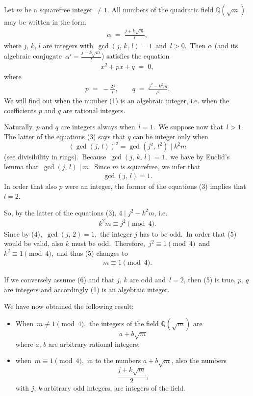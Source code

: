 \documentclass[12pt]{article}
\theoremstyle{definition}
\begin{document}
Let $m$ be a squarefree integer $\neq 1$.  All numbers of the 
quadratic field $\mathbb{Q}(\sqrt{m})$ may be written in the 
form
\begin{align}
\alpha \;=\; \frac{j+k\sqrt{m}}{l},
\end{align}
where $j,\,k,\,l$ are integers with\, $\gcd(j,\,k,\,l) = 1$\, 
and\, $l > 0$.\, Then $\alpha$ (and its algebraic conjugate\, 
$\alpha' = \frac{j-k\sqrt{m}}{l}$) satisfies the equation
\begin{align}
x^2+px+q \;=\; 0,
\end{align}
where
\begin{align}
p \;=\; -\frac{2j}{l}, \qquad q \;=\; \frac{j^2-k^2m}{l^2}.
\end{align}
We will find out when the number (1) is an algebraic integer, i.e. when the coefficients $p$ and $q$ are rational integers.

Naturally, $p$ and $q$ are integers always when\, $l = 1$.\, We 
suppose now that\, $l > 1$.\, The latter of the equations (3) 
says that $q$ can be integer only when
$$(\gcd(j,\,l))^2 = \gcd(j^2,\,l^2) \mid k^2m$$
(see divisibility in rings).\, Because\, $\gcd(j,\,k,\,l) = 1$,\, 
we have by Euclid's lemma that\, $\gcd(j,\,l) \mid m$.\, Since 
$m$ is squarefree, we infer that
\begin{align}
\gcd(j,\,l) = 1.
\end{align}
In order that also $p$ were an integer, the former of the 
equations (3) implies that\, $l = 2$.

So, by the latter of the equations (3),\; $4 \mid j^2\!-\!k^2m$, 
i.e.
\begin{align}
k^2m \equiv j^2 \pmod{4}.
\end{align}
Since by (4),\, $\gcd(j,\,2) = 1$,\, the integer $j$ has to be odd.\, In order that (5) would be valid, also $k$ must be odd.\, Therefore,\, $j^2 \equiv 1 \pmod{4}$\, and\, $k^2 \equiv 1 \pmod{4}$,\, and thus (5) changes to 
\begin{align}
m \equiv 1 \pmod{4}.
\end{align}

If we conversely assume (6) and that $j,\,k$ are odd and\, $l = 2$, then (5) is true, $p,\,q$ are integers and accordingly (1) is an algebraic integer.

We have now obtained the following result:
\begin{itemize}
\item When\, $m \not\equiv 1 \pmod{4}$,\, the integers of the field $\mathbb{Q}(\sqrt{m})$ are
$$a+b\sqrt{m}$$
where $a,\,b$ are arbitrary rational integers;
\item when\, $m \equiv 1 \pmod{4}$,\, in  to the numbers $a+b\sqrt{m}$, also the numbers
$$\frac{j+k\sqrt{m}}{2},$$
with $j,\,k$ arbitrary odd integers, are integers of the field.
\end{itemize}
\end{document}
